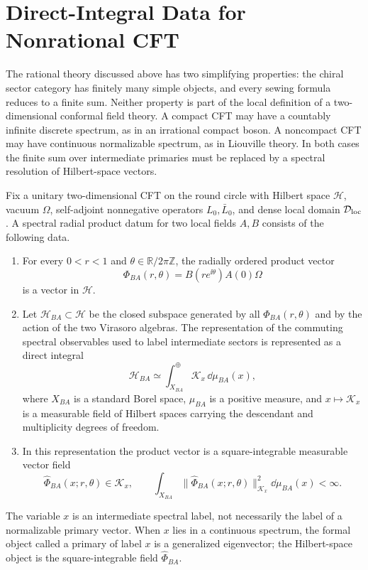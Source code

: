 \section{Direct-Integral Data for Nonrational CFT}
\label{sec:nonrational-cft-direct-integral-data}

The rational theory discussed above has two simplifying properties: the
chiral sector category has finitely many simple objects, and every sewing
formula reduces to a finite sum.  Neither property is part of the local
definition of a two-dimensional conformal field theory.  A compact CFT may
have a countably infinite discrete spectrum, as in an irrational compact
boson.  A noncompact CFT may have continuous normalizable spectrum, as in
Liouville theory.  In both cases the finite sum over intermediate primaries
must be replaced by a spectral resolution of Hilbert-space vectors.

\begin{definition}
\label{def:spectral-radial-product-datum}
Fix a unitary two-dimensional CFT on the round circle with Hilbert space
\(\mathcal H\), vacuum \(\Omega\), self-adjoint nonnegative operators
\(L_0,\bar L_0\), and dense local domain \(\mathcal D_{\rm loc}\).  A
spectral radial product datum for two local fields \(A,B\) consists of the
following data.
\begin{enumerate}
  \item For every \(0<r<1\) and \(\theta\in\mathbb R/2\pi\mathbb Z\), the
  radially ordered product vector
  \[
    \Phi_{BA}(r,\theta)=B(re^{\ii\theta})A(0)\Omega
  \]
  is a vector in \(\mathcal H\).
  \item Let \(\mathcal H_{BA}\subset\mathcal H\) be the closed subspace
  generated by all \(\Phi_{BA}(r,\theta)\) and by the action of the two
  Virasoro algebras.  The representation of the commuting spectral observables
  used to label intermediate sectors is represented as a direct integral
  \begin{equation}
    \mathcal H_{BA}
    \simeq
    \int_{X_{BA}}^{\oplus}\mathcal K_x\,\dd\mu_{BA}(x),
    \label{eq:direct-integral-ba}
  \end{equation}
  where \(X_{BA}\) is a standard Borel space, \(\mu_{BA}\) is a positive
  measure, and \(x\mapsto\mathcal K_x\) is a measurable field of Hilbert
  spaces carrying the descendant and multiplicity degrees of freedom.
  \item In this representation the product vector is a square-integrable
  measurable vector field
  \[
    \widehat\Phi_{BA}(x;r,\theta)\in\mathcal K_x,
    \qquad
    \int_{X_{BA}}\|\widehat\Phi_{BA}(x;r,\theta)\|_{\mathcal K_x}^2
      \dd\mu_{BA}(x)<\infty .
  \]
\end{enumerate}
The variable \(x\) is an intermediate spectral label, not necessarily the
label of a normalizable primary vector.  When \(x\) lies in a continuous
spectrum, the formal object called a primary of label \(x\) is a generalized
eigenvector; the Hilbert-space object is the square-integrable field
\(\widehat\Phi_{BA}\).
\end{definition}

